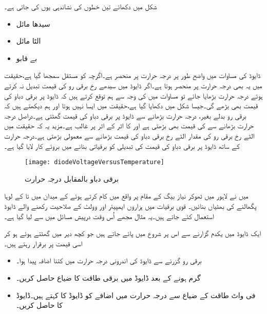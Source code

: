 شکل  میں دکھائے تین خطوں کی نشاندہی یوں کی جاتی ہے۔
\begin{itemize}
\item
سیدھا مائل  
\item
الٹا مائل 
\item
بے قابو 
\end{itemize}
ڈایوڈ کی مساوات میں  واضح طور پر درجہ حرارت پر منحصر ہے۔اگرچہ کو مستقل سمجھا گیا ہے،حقیقت میں یہ بھی درجہ حرارت پر منحصر ہوتا ہے۔اگر ڈایوڈ میں سیدھے رخ برقی رو کی قیمت تبدیل نہ کرتے ہوئے درجہ حرارت بڑھایا جائے تو مساوات   میں کی وجہ سے ہم توقع کرتے ہیں کہ ڈایوڈ پر برقی دباو کی قیمت بھی بڑھے گی۔جیسا شکل   میں دکھایا گیا ہے،حقیقت میں ایسا نہیں ہوتا اور ہم دیکھتے ہیں کہ برقی رو بدلے بغیر،   درجہ حرارت بڑھانے سے ڈایوڈ پر برقی دباو کی قیمت  گھٹتی ہے۔دراصل درجہ حرارت بڑھانے سے  کی قیمت بھی بڑھتی ہے اور   کا اثر کے اثر پر غالب ہے۔مزید یہ کہ حقیقت میں الٹے رخ برقی رو کی مقدار الٹے رخ برقی دباو کی قیمت بڑھانے سے معمولی بڑھتی ہے۔درجہ حرارت کے ساتھ ڈایوڈ پر برقی دباو کی قیمت کی تبدیلی کو برقیاتی  بنانے میں بروئے کار لایا گیا ہے۔

\begin{figure}
\centering
\texttt{[image: diodeVoltageVersusTemperature]}
\caption{برقی دباو بالمقابل درجہ حرارت}
\label{شکل_برقی_دباو_بالمقابل_حرارت}
\end{figure}

میں نے لاہور میں ٹھوکر نیاز بیگ کے مقام پر واقع  میں کام کرتے ہوئے  کے میدان میں  تا  کے  لوہا پگھالنے کی بھٹیاں بنائیں۔ قوی برقیات میں ہزاروں ایمپیئر اور وولٹ کے صلاحیت رکھنے والے ڈایوڈ استعمال کئے جاتے ہیں۔یہ مثال مجھے اُس وقت درپیش مسائل میں سے لیا گیا ہے۔
 
ایک ڈایوڈ میں یکدم  گزارنے سے اس پر شروع میں  پائے جاتے ہیں جو کچھ دیر میں گھٹتے ہوئے  ہو کر اسی قیمت پر برقرار رہتے ہیں۔
\begin{itemize}
\item
برقی رو گزرنے سے ڈایوڈ کی اندرونی درجہ حرارت میں کتنا اضافہ پیدا ہوا۔
\item
گرم ہونے کے بعد ڈایوڈ میں برقی طاقت کا ضیاع حاصل کریں۔
\item
فی واٹ طاقت کے ضیاع سے درجہ حرارت میں اضافے کو ڈایوڈ کا  کہتے ہیں۔ڈایوڈ کا  حاصل کریں۔
\end{itemize}


